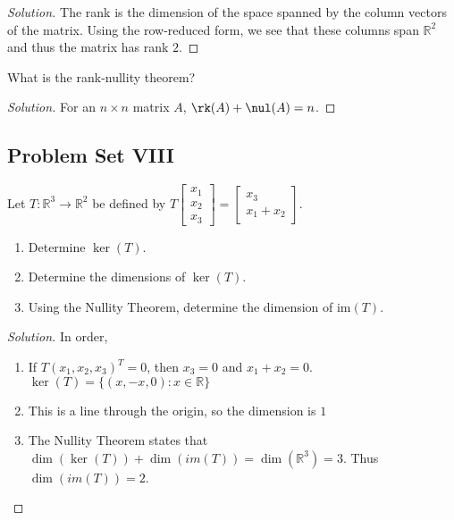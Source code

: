 \documentclass[crop=false,class=book,oneside]{standalone}                      %
\begin{document}
        \begin{proof}[Solution]
        The rank is the dimension of the space spanned by the column vectors of the matrix. Using the row-reduced form, we see that these columns span $\mathbb{R}^2$ and thus the matrix has rank $2$.
        \end{proof}
        \begin{problem}
        What is the rank-nullity theorem?
        \end{problem}
        \begin{proof}[Solution]
        For an $n\times n$ matrix $A$, $\rk(A)+\nul(A) = n$.
        \end{proof}
        \newpage
        \subsection{Problem Set VIII}
        \begin{problem}
        Let $T:\mathbb{R}^3\rightarrow \mathbb{R}^2$ be defined by $T\begin{bmatrix} x_1 \\ x_2 \\ x_3 \end{bmatrix} = \begin{bmatrix} x_3 \\ x_1+x_2 \end{bmatrix}$.
        \begin{enumerate}
            \item Determine $\ker(T)$.
            \item Determine the dimensions of $\ker(T)$.
            \item Using the Nullity Theorem, determine the dimension of im$(T)$.
        \end{enumerate}
        \end{problem}
        \begin{proof}[Solution]
        In order,
        \begin{enumerate}
            \item If $T(x_{1},x_{2},x_{3})^{T} = 0$, then $x_3=0$ and $x_{1}+x_{2}=0$. $\ker(T)=\{(x,-x,0):x\in \mathbb{R}\}$
            \item This is a line through the origin, so the dimension is $1$ 
            \item The Nullity Theorem states that $\dim(\ker(T))+\dim(im(T)) = \dim(\mathbb{R}^3) = 3$. Thus $\dim(im(T)) = 2$.
        \end{enumerate}
        \end{proof}
\end{document}
